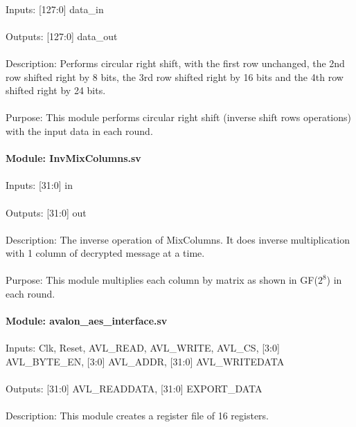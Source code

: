 \documentclass[11pt]{article}
\begin{document}
\\
Inputs: [127:0] data\_in\\
\\
Outputs: [127:0] data\_out\\
\\
Description: Performs circular right shift, with the first row unchanged, the 2nd row shifted right by 8 bits, the 3rd row shifted right by 16 bits and the 4th row shifted right by 24 bits.
\\ \\
Purpose: This module performs circular right shift (inverse shift rows operations) with the input data in each round. 
\\ 
\\
\textbf{Module: InvMixColumns.sv}\\
\\
Inputs: [31:0] in\\
\\
Outputs: [31:0] out
\\
\\
Description: The inverse operation of MixColumns. It does inverse multiplication with 1 column of decrypted message at a time.
\\ \\
Purpose: This module multiplies each column by matrix as shown in GF($2^8$) in each round. 
\\
\\
\textbf{Module: avalon\_aes\_interface.sv}\\
\\
Inputs: Clk, Reset, AVL\_READ, AVL\_WRITE, AVL\_CS, [3:0] AVL\_BYTE\_EN, [3:0] AVL\_ADDR, [31:0] AVL\_WRITEDATA\\
\\
Outputs: [31:0] AVL\_READDATA, [31:0] EXPORT\_DATA\\
\\
Description: This module creates a register file of 16 registers. \\
\end{document}
